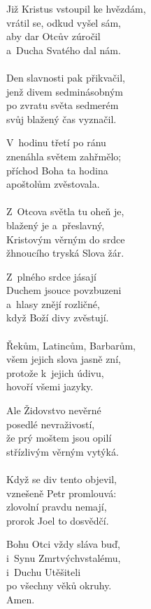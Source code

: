 \begin{translatioMulticol}{5}
Již Kristus vstoupil ke hvězdám,\\
vrátil se, odkud vyšel sám,\\
aby dar Otcův zúročil\\
a~Ducha Svatého dal nám.\\
\vspace{-2mm}\\
Den slavnosti pak přikvačil,\\
jenž divem sedminásobným\\
po zvratu světa sedmerém\\
svůj blažený čas vyznačil.\columnbreak

V~hodinu třetí po ránu\\
znenáhla světem zahřmělo;\\
příchod Boha ta hodina\\
apoštolům zvěstovala.\\
\vspace{-2mm}\\
Z~Otcova světla tu oheň je,\\
blažený je a~přeslavný,\\
Kristovým věrným do srdce\\
žhnoucího tryská Slova žár.\columnbreak

Z~plného srdce jásají\\
Duchem jsouce povzbuzeni\\
a~hlasy znějí rozličné,\\
když Boží divy zvěstují.\\
\vspace{-2mm}\\
Řekům, Latincům, Barbarům,\\
všem jejich slova jasně zní,\\
protože k~jejich údivu,\\
hovoří všemi jazyky.\columnbreak

Ale Židovstvo nevěrné\\
posedlé nevraživostí,\\
že prý moštem jsou opilí\\
střízlivým věrným vytýká.\\
\vspace{-2mm}\\
Když se div tento objevil,\\
vznešeně Petr promlouvá:\\
zlovolní pravdu nemají,\\
prorok Joel to dosvědčí.\columnbreak

Bohu Otci vždy sláva buď,\\
i~Synu Zmrtvýchvstalému,\\
i~Duchu Utěšiteli\\
po všechny věků okruhy.\\
Amen.
\end{translatioMulticol}
